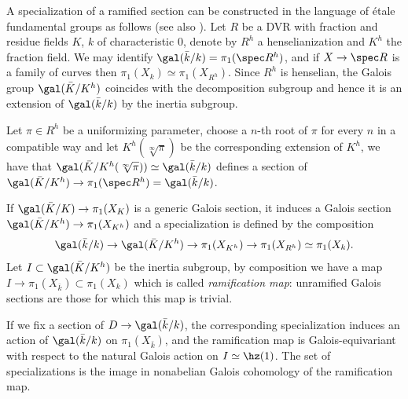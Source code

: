 \begin{remark}
\notready
	A specialization of a ramified section can be constructed in the language of étale fundamental groups as follows (see also \cite[Corollary 89]{sti13}). Let $R$ be a DVR with fraction and residue fields $K$, $k$ of characteristic $0$, denote by $R^{h}$ a henselianization and $K^{h}$ the fraction field. We may identify $\gal(\bar{k}/k)=\pi_{1}(\spec R^{h})$, and if $X\to \spec R$ is a family of curves then $\pi_{1}(X_{k})\simeq\pi_{1}(X_{R^{h}})$. Since $R^{h}$ is henselian, the Galois group $\gal(\bar{K}/K^{h})$ coincides with the decomposition subgroup and hence it is an extension of $\gal(\bar{k}/k)$ by the inertia subgroup.

	Let $\pi\in R^{h}$ be a uniformizing parameter, choose a $n$-th root of $\pi$ for every $n$ in a compatible way and let $K^{h}(\sqrt[\infty]{\pi})$ be the corresponding extension of $K^{h}$, we have that $\gal(\bar{K}/K^{h}(\sqrt[\infty]{\pi}))\simeq\gal(\bar{k}/k)$ defines a section of $\gal(\bar{K}/K^{h})\to\pi_{1}(\spec R^{h})=\gal(\bar{k}/k)$.


	If $\gal(\bar{K}/K)\to\pi_{1}(X_{K})$ is a generic Galois section, it induces a Galois section $\gal(\bar{K}/K^{h})\to\pi_{1}(X_{K^{h}})$ and a specialization is defined by the composition
	\[\gal(\bar{k}/k)\to \gal(\bar{K}/K^{h})\to \pi_{1}(X_{K^{h}})\to\pi_{1}(X_{R^{h}})\simeq\pi_{1}(X_{k}).\]
	Let $I\subset \gal(\bar{K}/K^{h})$ be the inertia subgroup, by composition we have a map $I\to\pi_{1}(X_{\bar{k}})\subset\pi_{1}(X_{k})$ which is called \emph{ramification map}: unramified Galois sections are those for which this map is trivial.

	If we fix a section of $D\to\gal(\bar{k}/k)$, the corresponding specialization induces an action of $\gal(\bar{k}/k)$ on $\pi_{1}(X_{\bar{k}})$, and the ramification map is Galois-equivariant with respect to the natural Galois action on $I\simeq\hz(1)$. The set of specializations is the image in nonabelian Galois cohomology of the ramification map.

\end{remark}


